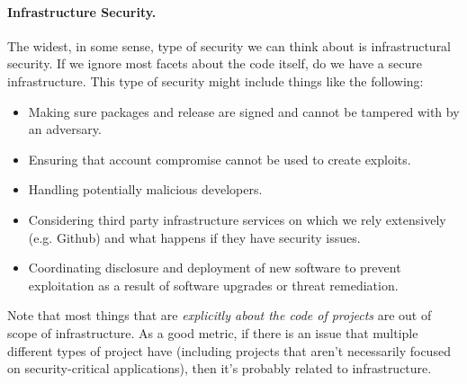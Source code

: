 \paragraph{Infrastructure Security.}  The widest, in some sense, type of security we can think about is infrastructural security.  If we ignore most facets about the code itself, do we have a secure infrastructure.  This type of security might include things like the following:
\begin{itemize}
\item Making sure packages and release are signed and cannot be tampered with by an adversary.
\item Ensuring that account compromise cannot be used to create exploits.
\item Handling potentially malicious developers.
\item Considering third party infrastructure services on which we rely extensively (e.g. Github) and what happens if they have security issues.
\item Coordinating disclosure and deployment of new software to prevent exploitation as a result of software upgrades or threat remediation.
\end{itemize}
Note that most things that are \emph{explicitly about the code of projects} are out of scope of infrastructure.  As a good metric, if there is an issue that multiple different types of project have (including projects that aren't necessarily focused on security-critical applications), then it's probably related to infrastructure.

